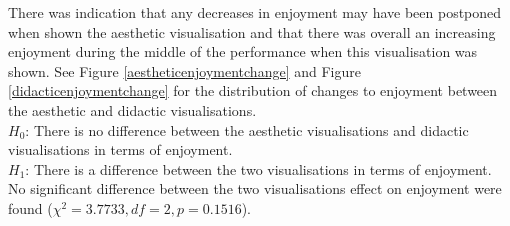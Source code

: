 \documentclass{article}
\begin{document}
There was indication that any decreases in enjoyment may have been postponed when shown the aesthetic visualisation and that there was overall an increasing enjoyment during the middle of the performance when this visualisation was shown. See Figure \ref{aestheticenjoymentchange} and Figure \ref{didacticenjoymentchange} for the distribution of changes to enjoyment between the aesthetic and didactic visualisations.\\

$H_0$: There is no difference between the aesthetic visualisations and didactic visualisations in terms of enjoyment.\\
$H_1$: There is a difference between the two visualisations in terms of enjoyment.\\

No significant difference between the two visualisations effect on enjoyment were found ($\chi^2=3.7733,df=2,p=0.1516$).
\end{document}
